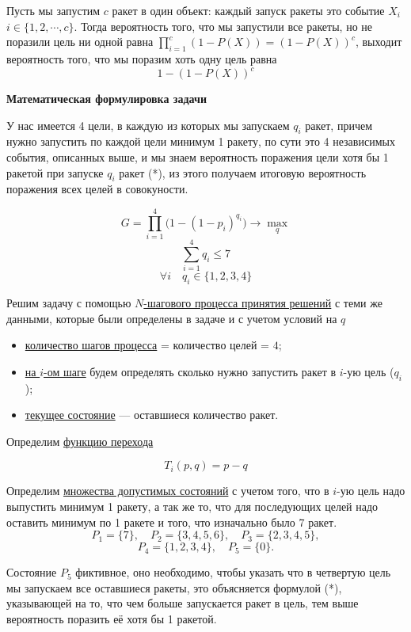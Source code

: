 Пусть мы запустим $c$ ракет в один объект: каждый запуск ракеты это событие $X_i$ $i \in \{1, 2, \cdots, c\}$. Тогда вероятность того, что мы запустили все ракеты, но не поразили цель ни одной равна $\displaystyle \prod_{i=1}^{c} (1 - P(X)) = (1 - P(X))^c$, выходит вероятность того, что мы поразим хоть одну цель равна 
\[1 - (1 - P(X))^c \tag{*}\]

\bigskip

\textbf{Математическая формулировка задачи}

У нас имеется 4 цели, в каждую из которых мы запускаем $q_i$ ракет, причем нужно запустить по каждой цели минимум 1 ракету, по сути это 4 независимых события, описанных выше, и мы знаем вероятность поражения цели хотя бы 1 ракетой при запуске $q_i$ ракет (*), из этого получаем итоговую вероятность поражения всех целей в совокуности.

\[G = \displaystyle \prod_{i=1}^{4} \big(1 - (1 - p_i)^{q_i}\big) \to \max_q\]
\[\sum_{i=1}^4 q_i \le 7\]
\[\forall i \quad q_i \in \{1, 2, 3, 4\}\]


\solution
Решим задачу с помощью \hyperref[n_step_process]{$N$-шагового процесса принятия решений} с теми же данными, которые были определены в задаче и с учетом условий на $q$

\begin{itemize}[nosep]
	\item \underline{количество шагов процесса} = количество целей = $4$;
	
	\item \underline{на $i$-ом шаге} будем определять сколько нужно запустить ракет в $i$-ую цель ($q_i$);
	
	\item \underline{текущее состояние} --- оставшиеся количество ракет.
\end{itemize}

\bigskip

Определим \underline{функцию перехода}

\[T_i(p, q) = p - q\]

\bigskip

Определим \underline{множества допустимых состояний} с учетом того, что в $i$-ую цель надо выпустить минимум 1 ракету, а так же то, что для последующих целей надо оставить минимум по 1 ракете и того, что изначально было 7 ракет.
\[
P_1 = \{7\}, \quad P_2 = \{3, 4, 5, 6\}, \quad P_3 = \{2, 3, 4, 5\},
\]
\[
P_4 = \{1, 2, 3, 4\}, \quad P_5 = \{0\}.
\]

Состояние $P_5$ фиктивное, оно необходимо, чтобы указать что в четвертую цель мы запускаем все оставшиеся ракеты, это объясняется формулой (*), указывающей на то, что чем больше запускается ракет в цель, тем выше вероятность поразить её хотя бы 1 ракетой.

